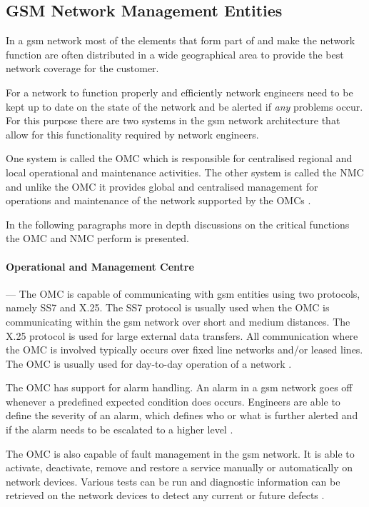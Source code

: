 \subsection{GSM Network Management Entities}
In a \gls{gsm} network most of the elements that form part of and make the network function are often distributed in a wide geographical area to provide the best network coverage for the customer. 

For a network to function properly and efficiently network engineers need to be kept up to date on the state of the network and be alerted if \emph{any} problems occur. For this purpose there are two systems in the \gls{gsm} network architecture that allow for this functionality required by network engineers. 

One system is called the \gls{OMC} which is responsible for centralised regional and local operational and maintenance activities. The other system is called the \gls{NMC} and unlike the \gls{OMC} it provides global and centralised management for operations and maintenance of the network supported by the OMCs \cite{GSMSysEngin}.

In the following paragraphs more in depth discussions on the critical functions the \gls{OMC} and \gls{NMC} perform is presented.

\paragraph{Operational and Management Centre}
--- The \gls{OMC} is capable of communicating with \gls{gsm} entities using two protocols, namely SS7 and X.25. The SS7 protocol is usually used when the \gls{OMC} is communicating within the \gls{gsm} network over short and medium distances. The X.25 protocol is used for large external data transfers. All communication where the \gls{OMC} is involved typically occurs over fixed line networks and/or leased lines. The \gls{OMC} is usually used for day-to-day operation of a network \cite{GSMSysEngin}.

The \gls{OMC} has support for alarm handling. An alarm in a \gls{gsm} network goes off whenever a predefined expected condition does occurs. Engineers are able to define the severity of an alarm, which defines who or what is further alerted and if the alarm needs to be escalated to a higher level \cite{GSMSysEngin}.

The \gls{OMC} is also capable of fault management in the \gls{gsm} network. It is able to activate, deactivate, remove and restore a service manually or automatically on network devices\cite{GSM92}. Various tests can be run and diagnostic information can be retrieved on the network devices to detect any current or future defects \cite{GSMSysEngin}.

